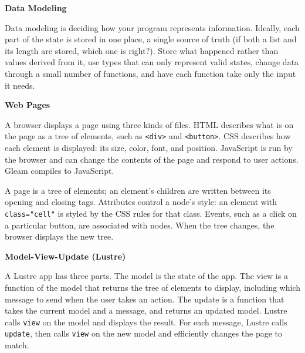 \begin{blocksection}
\textbf{Data Modeling}

Data modeling is deciding how your program represents information. Ideally, each part of the state is stored in one place, a single source of truth (if both a list and its length are stored, which one is right?). Store what happened rather than values derived from it, use types that can only represent valid states, change data through a small number of functions, and have each function take only the input it needs.

\end{blocksection}

\vspace{0.5\baselineskip}
\begin{blocksection}
\textbf{Web Pages}

A browser displays a page using three kinds of files. HTML describes what is on the page as a tree of elements, such as \lstinline$<div>$ and \lstinline$<button>$. CSS describes how each element is displayed: its size, color, font, and position. JavaScript is run by the browser and can change the contents of the page and respond to user actions. Gleam compiles to JavaScript.

A page is a tree of elements; an element's children are written between its opening and closing tags. Attributes control a node's style: an element with \lstinline$class="cell"$ is styled by the CSS rules for that class. Events, such as a click on a particular button, are associated with nodes. When the tree changes, the browser displays the new tree.

\end{blocksection}

\vspace{0.5\baselineskip}
\begin{blocksection}
\textbf{Model-View-Update (Lustre)}

A Lustre app has three parts. The model is the state of the app. The view is a function of the model that returns the tree of elements to display, including which message to send when the user takes an action. The update is a function that takes the current model and a message, and returns an updated model. Lustre calls \lstinline$view$ on the model and displays the result. For each message, Lustre calls \lstinline$update$, then calls \lstinline$view$ on the new model and efficiently changes the page to match.
\end{blocksection}

